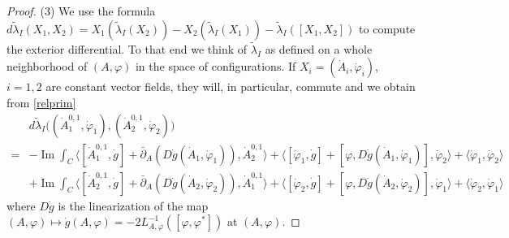 \documentclass[12pt,letterpaper,reqno]{amsart}
\theoremstyle{remark}
\theoremstyle{definition}
\numberwithin{thm}{section}
\numberwithin{equation}{section}
\numberwithin{figure}{section}
\DeclareMathOperator{\im}{Im}
\begin{document}
\begin{proof}
(3) We use the formula $d \tilde \lambda_I(X_1,X_2) = X_1(\tilde \lambda_I(X_2))-X_2(\tilde \lambda_I(X_1))-\tilde \lambda_I([X_1,X_2])$ to compute the exterior differential. To that end we think of $\tilde \lambda_I$ as defined on a whole neighborhood of $(A,\varphi)$ in the space of configurations. If $X_i = (\dot A_i, \dot \varphi_i)$, $i=1,2$ are constant vector fields, they will, in particular, commute and we obtain from \eqref{relprim}
\begin{align*}
	&d \tilde \lambda_I \bigl( (\dot A_1^{0,1}, \dot \varphi_1), (\dot A_2^{0,1}, \dot \varphi_2) \bigr) \\
	  =&  - \im  \int_C \langle  [\dot A_1^{0,1}, \dot g] + \bar\partial_A (D \dot g(\dot A_1, \dot \varphi_1)), \dot A_2^{0,1} \rangle   + \langle [ \dot \varphi_1, \dot g]+ [ \varphi, D\dot g(\dot A_1, \dot \varphi_1)], \dot \varphi_2 \rangle   +  \langle \dot \varphi_1, \dot \varphi_2 \rangle \\
	 & +\im \int_C \langle  [\dot A_2^{0,1}, \dot g] + \bar\partial_A (D \dot g(\dot A_2, \dot \varphi_2)), \dot A_1^{0,1} \rangle   + \langle [ \dot \varphi_2, \dot g]+ [ \varphi, D\dot g(\dot A_2, \dot \varphi_2)], \dot \varphi_1 \rangle   +  \langle \dot \varphi_2, \dot \varphi_1 \rangle 
\end{align*}
where $D \dot g$ is the linearization of the map $(A,\varphi) \mapsto \dot g(A,\varphi) = -2 L_{A,\varphi}^{-1}([\varphi,\varphi^*])$ at $(A,\varphi)$.
 

\end{proof}
\end{document}
